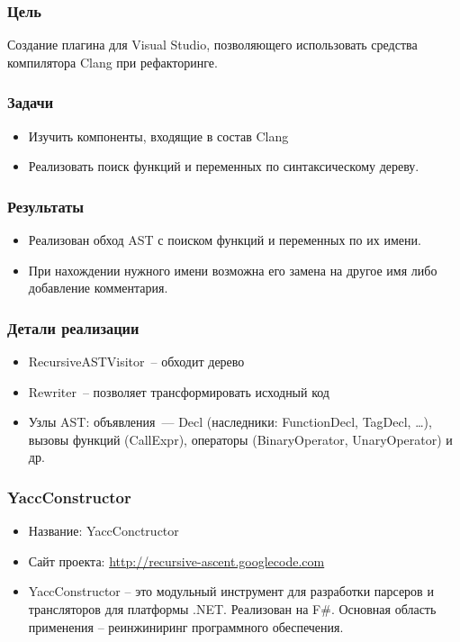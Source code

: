 \documentclass{beamer}
\begin{document}
\begin{frame}
	\transwipe[direction=90]
    \frametitle{Цель}
    Создание плагина для Visual Studio, позволяющего использовать средства компилятора Clang
при рефакторинге.
\end{frame}


\begin{frame}
	\transwipe[direction=90]
    \frametitle{Задачи}
    \begin{itemize}
        \item{Изучить компоненты, входящие в состав Clang}
        \item{Реализовать поиск функций и переменных по синтаксическому дереву.}
    \end{itemize}
\end{frame}


\begin{frame}
	\transwipe[direction=90]
    \frametitle{Результаты}
    \begin{itemize}
        \item{Реализован  обход AST с поиском функций и переменных по их имени.}
        \item{При нахождении нужного имени возможна его замена на другое имя либо добавление комментария.}
    \end{itemize}
\end{frame}

\begin{frame}
	\transwipe[direction=90]
    \frametitle{Детали реализации}
    \begin{itemize}
        \item{RecursiveASTVisitor~-- обходит дерево}
        \item{Rewriter~-- позволяет трансформировать исходный код}
        \item{Узлы AST: объявления~--- Decl (наследники: FunctionDecl, TagDecl, \ldots), вызовы функций (CallExpr), операторы (BinaryOperator, UnaryOperator) и др.}
    \end{itemize}
\end{frame}


\author[]{}

\title[YaccConstructor]{}

\begin{frame}
	\transwipe[direction=90]
	\frametitle{YaccConstructor}
	\begin{itemize}
		\item Название: YaccConctructor
		\item Сайт проекта: \href{http://recursive-ascent.googlecode.com} {http://recursive-ascent.googlecode.com}
		\item YaccConstructor -- это модульный инструмент для разработки парсеров и трансляторов для платформы .NET. Реализован на F\#. Основная область применения -- реинжиниринг программного обеспечения.
	\end{itemize}
\end{frame}
\end{document}
